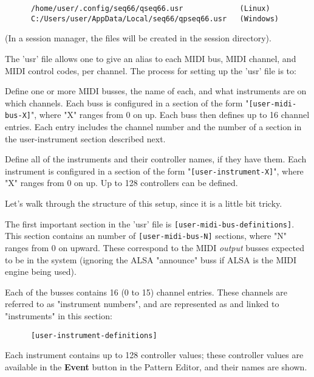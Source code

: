    \begin{verbatim}
      /home/user/.config/seq66/qseq66.usr             (Linux)
      C:/Users/user/AppData/Local/seq66/qpseq66.usr   (Windows)
   \end{verbatim}

   (In a session manager, the files will be created in the session directory).

   The 'usr' file allows one to give an alias to 
   each MIDI bus, MIDI channel, and MIDI control 
   codes, per channel.
   The process for setting up the 'usr' file is to:

   \begin{enumber}
      \item Define one or more MIDI busses, the name of each, and what
         instruments are on which channels.  Each buss is configured in a
         section of the form "\texttt{[user-midi-bus-X]}", where "X" ranges
         from 0 on up.  Each buss then defines up to 16 channel entries.
         Each entry includes the channel number and the number of a
         section in the user-instrument section described next.
      \item Define all of the instruments and their controller
         names, if they have them.  Each instrument is configured in a
         section of the form "\texttt{[user-instrument-X]}", where "X"
         ranges from 0 on up.  Up to 128 controllers can be defined.
   \end{enumber}

   Let's walk through the structure of this setup, since it is a little bit
   tricky.

   The first important section in the 'usr' file
   is \texttt{[user-midi-bus-definitions]}.
   This section contains an number
   of \texttt{[user-midi-bus-N]} sections, where "N" ranges from 0 on upward.
   These correspond to the MIDI \textsl{output}
   busses expected to be in the system (ignoring the ALSA "announce" buss if
   ALSA is the MIDI engine being used).

   Each of the busses contains 16 (0 to 15) channel entries.
   These channels are referred to as "instrument numbers", and are
   represented as and linked to "instruments" in this section:

   \begin{verbatim}
      [user-instrument-definitions]
   \end{verbatim}

   Each instrument contains up
   to 128 controller values; these controller values are available in the
   \textbf{Event} button in the Pattern Editor, and their names are shown.

